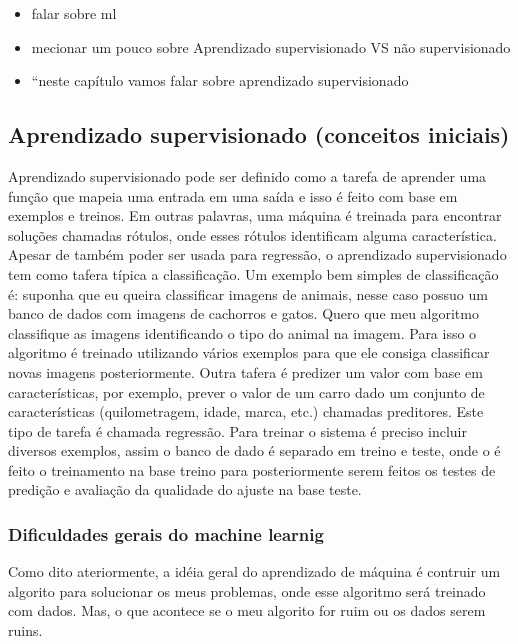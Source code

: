 \documentclass[
  letterpaper,
  DIV=11,
  numbers=noendperiod]{scrreprt}
\begin{document}
\begin{itemize}
\item
  falar sobre ml
\item
  mecionar um pouco sobre Aprendizado supervisionado VS não
  supervisionado
\item
  ``neste capítulo vamos falar sobre aprendizado supervisionado
\end{itemize}

\hypertarget{aprendizado-supervisionado-conceitos-iniciais}{%
\subsection{Aprendizado supervisionado (conceitos
iniciais)}\label{aprendizado-supervisionado-conceitos-iniciais}}

Aprendizado supervisionado pode ser definido como a tarefa de aprender
uma função que mapeia uma entrada em uma saída e isso é feito com base
em exemplos e treinos. Em outras palavras, uma máquina é treinada para
encontrar soluções chamadas rótulos, onde esses rótulos identificam
alguma característica. Apesar de também poder ser usada para regressão,
o aprendizado supervisionado tem como tafera típica a classificação. Um
exemplo bem simples de classificação é: suponha que eu queira
classificar imagens de animais, nesse caso possuo um banco de dados com
imagens de cachorros e gatos. Quero que meu algoritmo classifique as
imagens identificando o tipo do animal na imagem. Para isso o algoritmo
é treinado utilizando vários exemplos para que ele consiga classificar
novas imagens posteriormente. Outra tafera é predizer um valor com base
em características, por exemplo, prever o valor de um carro dado um
conjunto de características (quilometragem, idade, marca, etc.) chamadas
preditores. Este tipo de tarefa é chamada regressão. Para treinar o
sistema é preciso incluir diversos exemplos, assim o banco de dado é
separado em treino e teste, onde o é feito o treinamento na base treino
para posteriormente serem feitos os testes de predição e avaliação da
qualidade do ajuste na base teste.

\hypertarget{dificuldades-gerais-do-machine-learnig}{%
\subsubsection{Dificuldades gerais do machine
learnig}\label{dificuldades-gerais-do-machine-learnig}}

Como dito ateriormente, a idéia geral do aprendizado de máquina é
contruir um algorito para solucionar os meus problemas, onde esse
algoritmo será treinado com dados. Mas, o que acontece se o meu algorito
for ruim ou os dados serem ruins.
\end{document}
